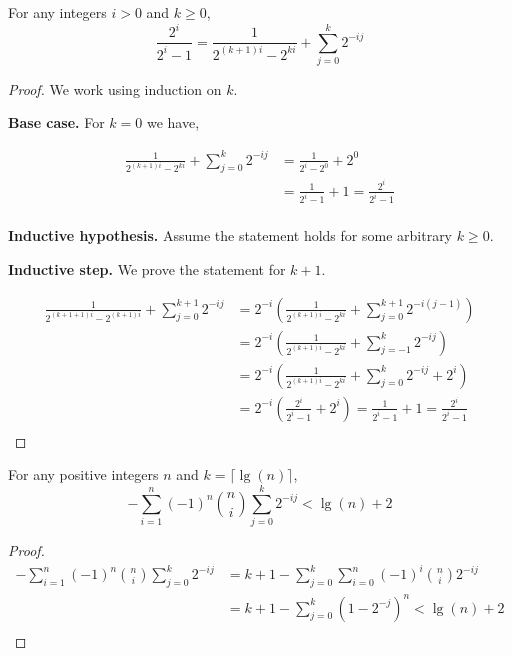 \begin{lemma}
  For any integers $i > 0$ and $k \ge 0$,
  \[
    \frac{2^i}{2^i-1} = \frac{1}{2^{(k+1)i}-2^{ki}} + \sum_{j=0}^k 2^{-ij}
  \]
\end{lemma}
\begin{proof}
  We work using induction on $k$.

  \noindent
  \textbf{Base case.}
  For $k=0$ we have,

  \begin{align*}
    \frac{1}{2^{(k+1)i}-2^{ki}} + \sum_{j=0}^k 2^{-ij}
    &= \frac{1}{2^i-2^0} + 2^0 \\
    &= \frac{1}{2^i-1} + 1 = \frac{2^i}{2^i-1} \\
  \end{align*}

  \noindent
  \textbf{Inductive hypothesis.}
  Assume the statement holds for some arbitrary $k \ge 0$.

  \noindent
  \textbf{Inductive step.}
  We prove the statement for $k+1$.

  \begin{align*}
    \frac{1}{2^{(k+1+1)i}-2^{(k+1)i}} + \sum_{j=0}^{k+1} 2^{-ij}
    &= 2^{-i} (\frac{1}{2^{(k+1)i}-2^{ki}} + \sum_{j=0}^{k+1} 2^{-i(j-1)}) \\
    &= 2^{-i} (\frac{1}{2^{(k+1)i}-2^{ki}} + \sum_{j=-1}^{k} 2^{-ij}) \\
    &= 2^{-i} (\frac{1}{2^{(k+1)i}-2^{ki}} + \sum_{j=0}^{k} 2^{-ij} + 2^i) \\
    &= 2^{-i} (\frac{2^i}{2^i-1} + 2^i) = \frac{1}{2^i-1} + 1 = \frac{2^i}{2^i-1} \\
  \end{align*}
\end{proof}

\begin{lemma}
  For any positive integers $n$ and $k=\lceil \lg(n) \rceil$,
  \[
    -\sum_{i=1}^n (-1)^n {n \choose i} \sum_{j=0}^k 2^{-ij} < \lg(n) + 2
  \]
\end{lemma}
\begin{proof}
  \begin{align*}
    -\sum_{i=1}^n (-1)^n {n \choose i} \sum_{j=0}^k 2^{-ij}
    &= k+1 - \sum_{j=0}^k \sum_{i=0}^n (-1)^i {n \choose i} 2^{-ij} \\
    &= k+1 - \sum_{j=0}^k (1-2^{-j})^n < \lg(n) + 2 \\
  \end{align*}
\end{proof}

